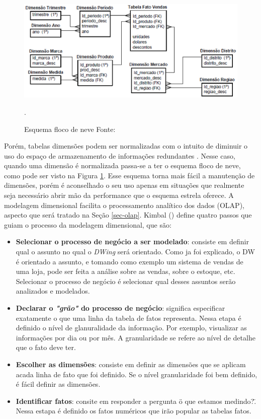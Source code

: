 \begin{figure}[!htb]
 	\centering
 		\includegraphics[scale=1]{figuras/dw-modelo-flocodeneve}
 		\caption{Esquema floco de neve  Fonte: \cite{Wagner2012}}.
 		\label{dw-snowflackscheme}
 \end{figure}

Porém, tabelas dimensões podem ser normalizadas com o intuito de diminuir o uso do espaço de armazenamento de informações redundantes \cite{kimball2002}. Nesse caso, quando uma dimensão é normalizada passa-se a ter o esquema floco de neve, como pode ser visto na Figura \ref{dw-snowflackscheme}. Esse esquema torna mais fácil a manutenção de dimensões, porém é aconselhado o seu uso apenas em situações que realmente seja necessário abrir mão da performance que o esquema estrela oferece.
%
A modelagem dimensional facilita o processamento analítico dos dados (OLAP), aspecto que será tratado na Seção \ref{sec-olap}.
%
Kimbal (\citeyear{kimball2002}) define quatro passos que guiam o processo da modelagem dimensional, que são:

 \begin{itemize}

 	\item \textbf{Selecionar o processo de negócio a ser modelado}: consiste em definir qual o assunto no qual o \emph{DWing} será orientado. Como ja foi explicado, o DW é orientado a assunto, e tomando como exemplo um sistema de vendas de uma loja, pode ser feita a análise sobre as vendas, sobre o estoque, etc. Selecionar o processo de negócio é selecionar qual desses assuntos serão analizados e modelados.

 	\item \textbf{Declarar o \emph{"grão"} do processo de negócio}: significa especificar exatamente o que uma linha da tabela de fatos representa. Nessa etapa é definido o nível de glanuralidade da informação. Por exemplo, visualizar as informações por dia ou por mês. A granularidade se refere ao nível de detalhe que o fato deve ter. 

 	\item \textbf{Escolher as dimensões}: consiste em definir as dimensões que se aplicam acada linha de fato que foi definido. Se o nível granularidade foi bem definido, é fácil definir as dimensões. 

 	\item \textbf{Identificar fatos}: consite em responder a pergunta \"o que estamos medindo?\". Nessa estapa é definido os fatos numéricos que irão popular as tabelas fatos.	  
 \end{itemize}

